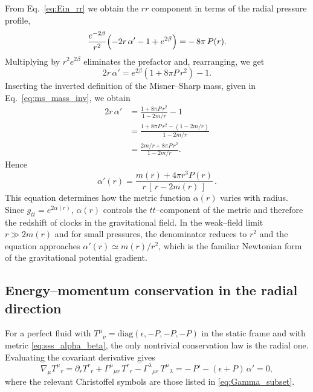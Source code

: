 From Eq.~\eqref{eq:Ein_rr} we obtain the $rr$ component in terms of the radial pressure profile,
\begin{equation}
\frac{e^{-2\beta}}{r^{2}}\Bigl(-2r\,\alpha'-1+e^{2\beta}\Bigr)=-\,8\pi\,P(r).
\label{eq:Ein_rr_repeat}
\end{equation}
Multiplying by $r^{2}e^{2\beta}$ eliminates the prefactor and, rearranging, we get 
\begin{equation}
2r\,\alpha' = e^{2\beta}\!\left(1+8\pi P\,r^{2}\right) - 1.
\end{equation}
Inserting the inverted definition of the Misner--Sharp mass, given in Eq.~\eqref{eq:ms_mass_inv}, we obtain
\begin{align}
2r\,\alpha' &= \frac{1+8\pi P\,r^{2}}{1-2m/r}-1 \nonumber\\
            &= \frac{1+8\pi P\,r^{2}-(1-2m/r)}{1-2m/r}\nonumber\\
            &= \frac{2m/r+8\pi P\,r^{2}}{1-2m/r}.
\end{align}
Hence
\begin{equation}
\boxed{\;
\alpha'(r)=\frac{m(r)+4\pi r^{3}P(r)}{r\,[\,r-2m(r)\,]}\,.
\;}
\label{eq:alpha_prime}
\end{equation}
This equation determines how the metric function $\alpha(r)$ varies with radius. 
Since $g_{tt}=e^{2\alpha(r)}$, $\alpha(r)$ controls the $tt$--component of the metric and 
therefore the redshift of clocks in the gravitational field. 
In the weak–field limit $r \gg 2m(r)$ and for small pressures, the denominator reduces to $r^{2}$ 
and the equation approaches $\alpha'(r)\simeq m(r)/r^{2}$, 
which is the familiar Newtonian form of the gravitational potential gradient.

\subsection*{Energy–momentum conservation in the radial direction}

For a perfect fluid with $T^{\mu}{}_{\nu}=\mathrm{diag}(\epsilon,-P,-P,-P)$ 
in the static frame and with metric \eqref{eq:sss_alpha_beta}, 
the only nontrivial conservation law is the radial one. 
Evaluating the covariant derivative gives
\begin{equation}
\nabla_{\mu}T^{\mu}{}_{r}
=\partial_{r}T^{r}{}_{r}
+\Gamma^{\mu}{}_{\mu r}\,T^{r}{}_{r}
-\Gamma^{\lambda}{}_{\mu r}\,T^{\mu}{}_{\lambda}
= -\,P' - (\epsilon+P)\,\alpha' = 0,
\label{eq:fluid_cons_component}
\end{equation}
where the relevant Christoffel symbols 
are those listed in \eqref{eq:Gamma_subset}.

